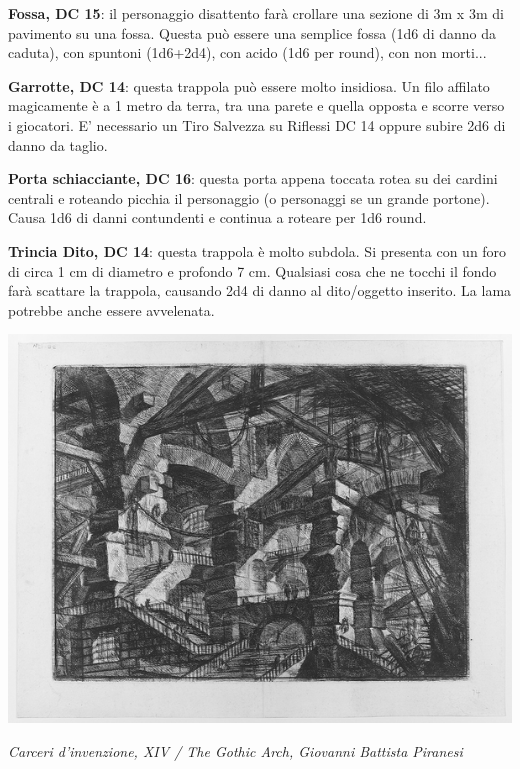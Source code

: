 \begin{multicols}{2}
\textbf{Fossa, DC 15}: il personaggio disattento farà crollare una sezione di 3m x 3m di pavimento su una fossa. Questa può essere una semplice fossa (1d6 di danno da caduta), con spuntoni (1d6+2d4), con acido (1d6 per round), con non morti...

\textbf{Garrotte, DC 14}: questa trappola può essere molto insidiosa. Un filo affilato magicamente è a 1 metro da terra, tra una parete e quella opposta e scorre verso i giocatori.
E' necessario un Tiro Salvezza su Riflessi DC 14 oppure subire 2d6 di danno da taglio.

\textbf{Porta schiacciante, DC 16}: questa porta appena toccata rotea su dei cardini centrali e roteando picchia il personaggio (o personaggi se un grande portone). Causa 1d6 di danni contundenti e continua a roteare per 1d6 round.

\textbf{Trincia Dito, DC 14}: questa trappola è molto subdola. Si presenta con un foro di circa 1 cm di diametro e profondo 7 cm. Qualsiasi cosa che ne tocchi il fondo farà scattare la trappola, causando 2d4 di danno al dito/oggetto inserito. La lama potrebbe anche essere avvelenata.

\end{multicols}

\vfill

\begin{center}
\includegraphics[width=0.35\linewidth]{immagini/GBP14.png}

\emph{Carceri d'invenzione, XIV / The Gothic Arch, Giovanni Battista Piranesi}
\end{center}

\pagebreak
